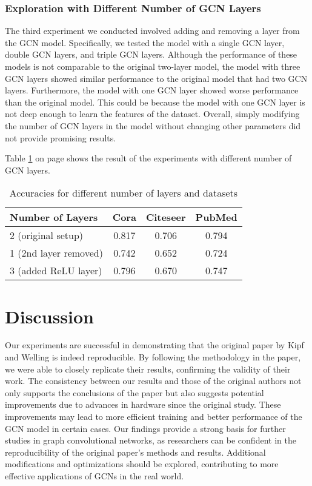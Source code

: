 \documentclass[11pt,a4paper]{article}
\begin{document}
\subsubsection{Exploration with Different Number of GCN Layers}

The third experiment we conducted involved adding and removing a layer from the GCN model. Specifically, we tested the model with a single GCN layer, double GCN layers, and triple GCN layers. Although the performance of these models is not comparable to the original two-layer model, the model with three GCN layers showed similar performance to the original model that had two GCN layers. Furthermore, the model with one GCN layer showed worse performance than the original model. This could be because the model with one GCN layer is not deep enough to learn the features of the dataset. Overall, simply modifying the number of GCN layers in the model without changing other parameters did not provide promising results.

Table \ref{table:number-of-layers} on page \pageref{table:number-of-layers} shows the result of the experiments with different number of GCN layers.

\begin{table}[h]
  \centering
  \begin{tabular}{p{2.5cm}|c|c|c}
  \textbf{Number of Layers} & \textbf{Cora} & \textbf{Citeseer} & \textbf{PubMed} \\ \hline
  2 (original setup)      & 0.817 & 0.706 & 0.794 \\
  1 (2nd layer removed)   & 0.742 & 0.652 & 0.724 \\
  3 (added ReLU layer)    & 0.796 & 0.670 & 0.747
  \end{tabular}
  \caption{Accuracies for different number of layers and datasets}
  \label{table:number-of-layers}
\end{table}

\section{Discussion}

Our experiments are successful in demonstrating that the original paper by Kipf and Welling is indeed reproducible. By following the methodology in the paper, we were able to closely replicate their results, confirming the validity of their work.
The consistency between our results and those of the original authors not only supports the conclusions of the paper but also suggests potential improvements due to advances in hardware since the original study. These improvements may lead to more efficient training and better performance of the GCN model in certain cases. Our findings provide a strong basis for further studies in graph convolutional networks, as researchers can be confident in the reproducibility of the original paper's methods and results. Additional modifications and optimizations should be explored, contributing to more effective applications of GCNs in the real world.
\end{document}
